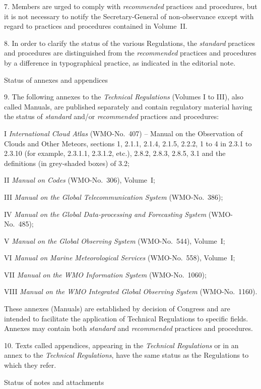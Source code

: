 7. Members are urged to comply with \emph{recommended} practices and procedures, but it is not necessary to notify the Secretary-General of non-observance except with regard to practices and procedures contained in Volume~II.

8. In order to clarify the status of the various Regulations, the \emph{standard} practices and procedures are distinguished from the \emph{recommended} practices and procedures by a difference in typographical practice, as indicated in the editorial note.

Status of annexes and appendices

9. The following annexes to the \emph{Technical Regulations} (Volumes I to III), also called Manuals, are published separately and contain regulatory material having the status of \emph{standard} and/or \emph{recommended} practices and procedures:

I \emph{International Cloud Atlas} (WMO-No.~407) -- Manual on the Observation of Clouds and Other Meteors, sections 1, 2.1.1, 2.1.4, 2.1.5, 2.2.2, 1 to 4 in 2.3.1 to 2.3.10 (for example, 2.3.1.1, 2.3.1.2, etc.), 2.8.2, 2.8.3, 2.8.5, 3.1 and the definitions (in grey-shaded boxes) of 3.2;

II \emph{Manual on Codes} (WMO-No.~306), Volume~I;

III \emph{Manual on the Global Telecommunication System} (WMO-No.~386);

IV \emph{Manual on the Global Data-processing and Forecasting System} (WMO-No.~485);

V \emph{Manual on the Global Observing System} (WMO-No.~544), Volume~I;

VI \emph{Manual on Marine Meteorological Services} (WMO-No.~558), Volume~I;

VII \emph{Manual on the WMO Information System} (WMO-No.~1060);

VIII \emph{Manual on the WMO Integrated Global Observing System} (WMO-No.~1160).

These annexes (Manuals) are established by decision of Congress and are intended to facilitate the application of Technical Regulations to specific fields. Annexes may contain both \emph{standard} and \emph{recommended} practices and procedures.

10. Texts called appendices, appearing in the \emph{Technical Regulations} or in an annex to the \emph{Technical Regulations}, have the same status as the Regulations to which they refer.

Status of notes and attachments

